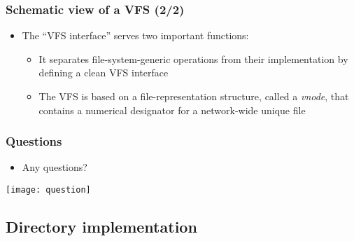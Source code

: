 \documentclass[CJKutf8,dvipsnames,table]{beamer}
\begin{document}
\begin{CJK*}{UTF8}{song}
  \begin{frame}
    \frametitle{Schematic view of a VFS (2/2)} \pause
    \begin{itemize}\parskip=0pt
    \item The ``VFS interface'' serves two important functions: \pause
      \begin{itemize}\parskip=0pt
      \item It separates file-system-generic operations from their implementation by defining a clean VFS interface \pause
      \item The VFS is based on a file-representation structure, called a \emph{vnode}, that contains a numerical designator for a network-wide unique file
      \end{itemize}
    \end{itemize}
  \end{frame}
  
  \begin{frame}
    \frametitle{Questions}
    \begin{itemize}
    \item Any questions?
    \end{itemize}
    \begin{center}
      \texttt{[image: question]}
    \end{center}
  \end{frame}

  \subsection{Directory implementation}
  

\end{CJK*}
\end{document}
